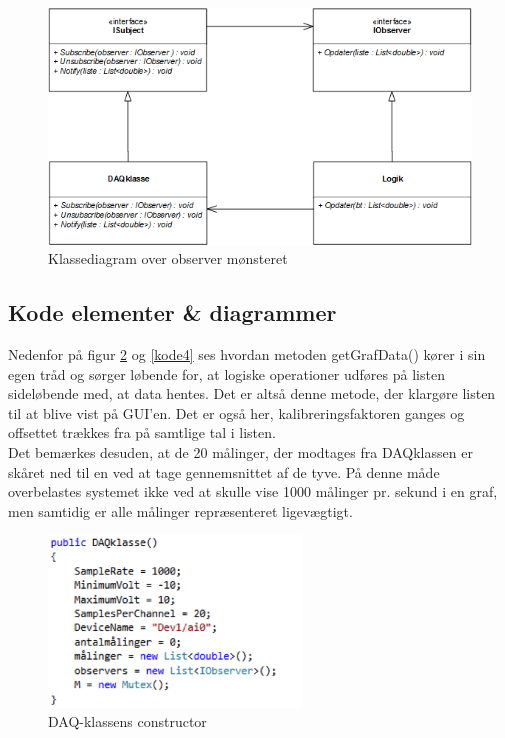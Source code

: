 \begin{figure}[H]
	\centering
	\includegraphics[width=1\textwidth]{Figurer/SoftwareImplementering/observer}
	\caption{Klassediagram over observer mønsteret}
	\label{observerklasse}
\end{figure}

\subsection{Kode elementer \& diagrammer}
Nedenfor på figur \ref{kode3} og \ref{kode4} ses hvordan metoden getGrafData() kører i sin egen tråd og sørger løbende for, at logiske operationer udføres på listen sideløbende med, at data hentes. Det er altså denne metode, der klargøre listen til at blive vist på GUI’en. Det er også her, kalibreringsfaktoren ganges og offsettet trækkes fra på samtlige tal i listen.\\ 
Det bemærkes desuden, at de 20 målinger, der modtages fra DAQklassen er skåret ned til en ved at tage gennemsnittet af de tyve. På denne måde overbelastes systemet ikke ved at skulle vise 1000 målinger pr. sekund i en graf, men samtidig er alle målinger repræsenteret ligevægtigt.
\begin{figure}[H]
	\includegraphics[width=0.6\textwidth]{Figurer/Jeppe/3}
	\caption{DAQ-klassens constructor}
	\label{kode3}
\end{figure}

